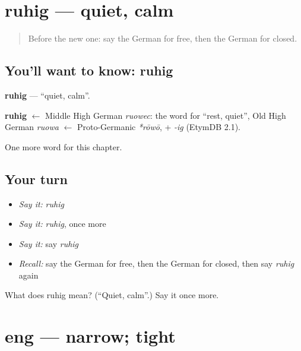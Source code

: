 \section[ruhig]{ruhig — quiet, calm}

\label{lesson:GE-C131-ruhig}



\begin{quote}
Before the new one: say the German for free, then the German for closed.
\end{quote}

\subsection*{You'll want to know: ruhig}
\textbf{ruhig} — \textquotedblleft{}quiet, calm\textquotedblright{}.

\begin{cousinweb}
\textbf{ruhig} $\leftarrow$ Middle High German \emph{ruowec}: the word for \textquotedblleft{}rest, quiet\textquotedblright{}, Old High German \emph{ruowa} $\leftarrow$ Proto-Germanic \emph{*rōwō}, + \emph{-ig} (EtymDB 2.1).
\end{cousinweb}

\begin{grammarlens}[title={What you've built}]
One more word for this chapter.
\end{grammarlens}

\subsection*{Your turn}
\begin{itemize}
\raggedright
  \item \emph{Say it:} \emph{ruhig}
  \item \emph{Say it:} \emph{ruhig}, once more
  \item \emph{Say it:} say \emph{ruhig}
  \item \emph{Recall:} say the German for free, then the German for closed, then say \emph{ruhig} again
\end{itemize}

\begin{tcolorbox}[breakable,colback=teal!4,colframe=teal!35!black,title={Before you move on}]
What does ruhig mean? (\textquotedblleft{}Quiet, calm\textquotedblright{}.) Say it once more.
\end{tcolorbox}
\section[eng]{eng — narrow; tight}

